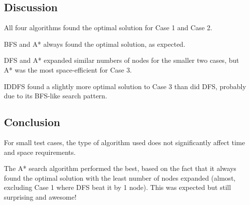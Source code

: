 \documentclass[12pt,letterpaper]{article}
\begin{document}
\subsection*{Discussion}


All four algorithms found the optimal solution for Case 1 and Case 2.

BFS and A* always found the optimal solution, as expected.

DFS and A* expanded similar numbers of nodes for the smaller two cases, but A*
was the most space-efficient for Case 3.

IDDFS found a slightly more optimal solution to Case 3 than did DFS, probably
due to its BFS-like search pattern.


\subsection*{Conclusion}


For small test cases, the type of algorithm used does not significantly affect
time and space requirements.

The A* search algorithm performed the best, based on the fact that it always
found the optimal solution with the least number of nodes expanded (almost,
excluding Case 1 where DFS beat it by 1 node). This was expected but still
surprising and awesome!
\end{document}
